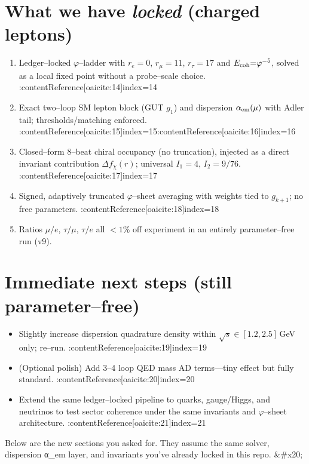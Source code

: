 \documentclass[12pt]{article}
\begin{document}
\section*{What we have \emph{locked} (charged leptons)}
\begin{enumerate}
\item Ledger--locked $\varphi$--ladder with $r_e{=}0$, $r_\mu{=}11$, $r_\tau{=}17$ and $E_{\rm coh}{=}\varphi^{-5}$, solved as a local fixed point without a probe--scale choice. :contentReference[oaicite:14]{index=14}
\item Exact two--loop SM lepton block (GUT $g_1$) and dispersion $\alpha_{\rm em}(\mu)$ with Adler tail; thresholds/matching enforced. :contentReference[oaicite:15]{index=15}:contentReference[oaicite:16]{index=16}
\item Closed--form $8$--beat chiral occupancy (no truncation), injected as a direct invariant contribution $\Delta f_\chi(r)$; universal $I_1{=}4$, $I_2{=}9/76$. :contentReference[oaicite:17]{index=17}
\item Signed, adaptively truncated $\varphi$--sheet averaging with weights tied to $g_{k+1}$; no free parameters. :contentReference[oaicite:18]{index=18}
\item Ratios $\mu/e$, $\tau/\mu$, $\tau/e$ all $<1\%$ off experiment in an entirely parameter--free run (v9).
\end{enumerate}

\section*{Immediate next steps (still parameter--free)}
\begin{itemize}
\item Slightly increase dispersion quadrature density within $\sqrt{s}\!\in\![1.2,2.5]\,$GeV only; re--run. :contentReference[oaicite:19]{index=19}
\item (Optional polish) Add 3--4 loop QED mass AD terms---tiny effect but fully standard. :contentReference[oaicite:20]{index=20}
\item Extend the same ledger--locked pipeline to quarks, gauge/Higgs, and neutrinos to test sector coherence under the same invariants and $\varphi$--sheet architecture. :contentReference[oaicite:21]{index=21}
\end{itemize}

Below are the new sections you asked for. They assume the same solver, dispersion α\_em layer, and invariants you’ve already locked in this repo.   &#x20;
\end{document}
